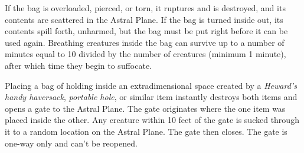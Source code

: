 \documentclass[letterpaper, 11pt, bg=full, twocolumn, stats=modern]{dndbook}
\begin{document}
If the bag is overloaded, pierced, or torn, it ruptures and is destroyed, and its contents are scattered in the Astral Plane. If the bag is turned inside out, its contents spill forth, unharmed, but the bag must be put right before it can be used again. Breathing creatures inside the bag can survive up to a number of minutes equal to 10 divided by the number of creatures (minimum 1 minute), after which time they begin to suffocate.

Placing a bag of holding inside an extradimensional space created by a \textit{Heward's handy haversack}, \textit{portable hole}, or similar item instantly destroys both items and opens a gate to the Astral Plane. The gate originates where the one item was placed inside the other. Any creature within 10 feet of the gate is sucked through it to a random location on the Astral Plane. The gate then closes. The gate is one-way only and can't be reopened.
\end{document}

